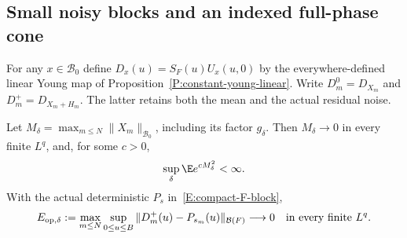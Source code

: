 \subsection{Small noisy blocks and an indexed full-phase cone}

For any $x\in\mathscr B_0$ define
$D_x(u)=S_F(u)U_x(u,0)$ by the everywhere-defined linear Young
map of Proposition~\ref{P:constant-young-linear}.
Write $D_m^0=D_{X_m}$ and $D_m^+=D_{X_m+H_m}$.
The latter retains both the mean and the actual residual noise.

\begin{lemma}
  \label{L:raw-block-uniform-error}
  Let $M_\delta=\max_{m\le N}\|X_m\|_{\mathscr B_0}$, including
  its factor $g_\delta$. Then $M_\delta\to0$ in every finite $L^q$,
  and, for some $c>0$,
  \begin{equation}\label{E:raw-block-maximum-exponential}
    \sup_\delta\E e^{cM_\delta^2}<\infty.
  \end{equation}
  With the actual deterministic $P_s$ in~\eqref{E:compact-F-block},
  \begin{equation}\label{E:raw-block-operator-error}
    E_{\mathrm{op},\delta}:=
    \max_{m\le N}\sup_{0\le u\le B}
    \|D_m^+(u)-P_{s_m}(u)\|_{\mathcal B(F)}
    \longrightarrow0
    \quad\hbox{in every finite }L^q.
  \end{equation}
\end{lemma}


